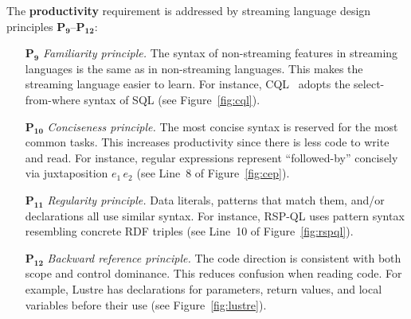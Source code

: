 The \textbf{productivity} requirement is addressed by streaming
language design principles $\mathbf{P_9}$--$\mathbf{P_{12}}$:
\begin{itemize}[leftmargin=6mm]
  \item[$\mathbf{P_9}$] \emph{Familiarity principle.} The syntax of
    non-streaming features in streaming languages is the same as in
    non-streaming languages. This makes the streaming language easier
    to learn. For instance, CQL~\cite{arasu_widom_2004} adopts the
    select-from-where syntax of SQL (see Figure~\ref{fig:cql}).
  \item[$\mathbf{P_{10}}$] \emph{Conciseness principle.} The most concise
    syntax is reserved for the most common tasks. This increases
    productivity since there is less code to write and read. For
    instance, regular expressions represent ``followed-by'' concisely
    via juxtaposition \mbox{$e_1\,e_2$} (see Line~8 of
    Figure~\ref{fig:cep}).
  \item[$\mathbf{P_{11}}$] \emph{Regularity principle.} Data literals,
    patterns that match them, and/or declarations all use similar
    syntax. For instance, RSP-QL uses pattern syntax resembling
    concrete RDF triples (see Line~10 of Figure~\ref{fig:rspql}).
  \item[$\mathbf{P_{12}}$] \emph{Backward reference principle.} The code
    direction is consistent with both scope and control dominance.
    This reduces confusion when reading code. For example, Lustre has
    declarations for parameters, return values, and local variables
    before their use (see Figure~\ref{fig:lustre}).
\end{itemize}

